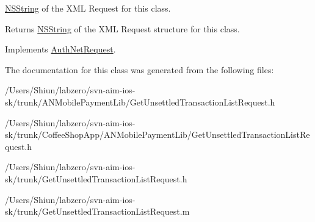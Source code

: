 \hyperlink{class_n_s_string}{NSString} of the XML Request for this class. 

\begin{DoxyReturn}{Returns}
\hyperlink{class_n_s_string}{NSString} of the XML Request structure for this class. 
\end{DoxyReturn}


Implements \hyperlink{interface_auth_net_request_aab99d065f49b7ed086b041c1c70e2975}{AuthNetRequest}.



The documentation for this class was generated from the following files:\begin{DoxyCompactItemize}
\item 
/Users/Shiun/labzero/svn-\/aim-\/ios-\/sk/trunk/ANMobilePaymentLib/GetUnsettledTransactionListRequest.h\item 
/Users/Shiun/labzero/svn-\/aim-\/ios-\/sk/trunk/CoffeeShopApp/ANMobilePaymentLib/GetUnsettledTransactionListRequest.h\item 
/Users/Shiun/labzero/svn-\/aim-\/ios-\/sk/trunk/GetUnsettledTransactionListRequest.h\item 
/Users/Shiun/labzero/svn-\/aim-\/ios-\/sk/trunk/GetUnsettledTransactionListRequest.m\end{DoxyCompactItemize}
